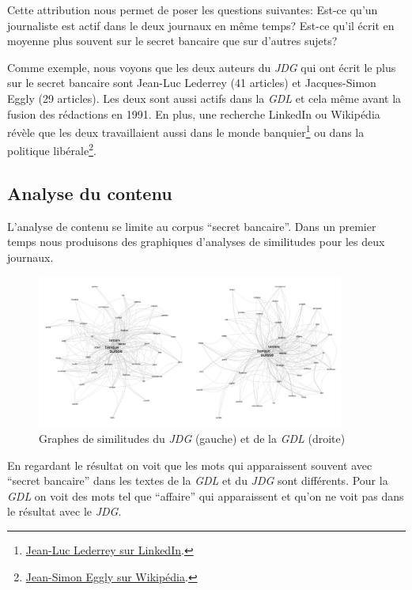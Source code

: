 \documentclass[11pt]{article}
\begin{document}
Cette attribution nous permet de poser les questions suivantes: Est-ce
qu'un journaliste est actif dans le deux journaux en même temps? Est-ce
qu'il écrit en moyenne plus souvent sur le secret bancaire que sur
d'autres sujets?

Comme exemple, nous voyons que les deux auteurs du \emph{JDG} qui ont
écrit le plus sur le secret bancaire sont Jean-Luc Lederrey (41
articles) et Jacques-Simon Eggly (29 articles). Les deux sont aussi
actifs dans la \emph{GDL} et cela même avant la fusion des rédactions en
1991. En plus, une recherche LinkedIn ou Wikipédia révèle que les deux
travaillaient aussi dans le monde banquier\footnote{\href{https://ch.linkedin.com/in/lederrey-jean-luc-1456b717}{Jean-Luc
  Lederrey sur LinkedIn}.} ou dans la politique libérale\footnote{\href{https://fr.wikipedia.org/wiki/Jacques-Simon_Eggly}{Jean-Simon
  Eggly sur Wikipédia}.}.

\hypertarget{analyse-du-contenu}{%
\subsection{Analyse du contenu}\label{analyse-du-contenu}}

L'analyse de contenu se limite au corpus ``secret bancaire''. Dans un
premier temps nous produisons des graphiques d'analyses de similitudes
pour les deux journaux.

\begin{figure}
\centering
\includegraphics[width=0.9\textwidth ]{methodology/similitude.png}
\caption{Graphes de similitudes du \emph{JDG} (gauche) et de la
\emph{GDL} (droite)}
\end{figure}

En regardant le résultat on voit que les mots qui apparaissent souvent
avec ``secret bancaire'' dans les textes de la \emph{GDL} et du
\emph{JDG} sont différents. Pour la \emph{GDL} on voit des mots tel que
``affaire'' qui apparaissent et qu'on ne voit pas dans le résultat avec
le \emph{JDG}.
\end{document}

